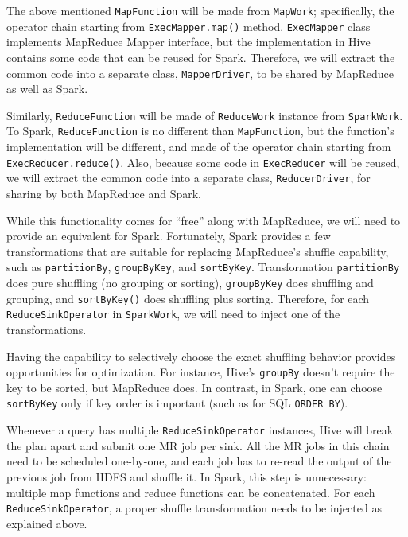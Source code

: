 \documentclass{vldb}
\begin{document}

The above mentioned \texttt{MapFunction} will be made from
\texttt{MapWork}; specifically, the operator chain starting from
\texttt{ExecMapper.map()} method. \texttt{ExecMapper} class implements
MapReduce Mapper interface, but the implementation in Hive contains some
code that can be reused for Spark. Therefore, we will extract the common
code into a separate class, \texttt{MapperDriver}, to be shared by
MapReduce as well as Spark.


Similarly, \texttt{ReduceFunction} will be made of \texttt{ReduceWork}
instance from \texttt{SparkWork}. To Spark, \texttt{ReduceFunction} is
no different than \texttt{MapFunction}, but the function's
implementation will be different, and made of the operator chain
starting from \texttt{ExecReducer.reduce()}. Also, because some code in
\texttt{ExecReducer} will be reused, we will extract the common code
into a separate class, \texttt{ReducerDriver}, for sharing by both
MapReduce and Spark.


While this functionality comes for ``free'' along with MapReduce, we
will need to provide an equivalent for Spark. Fortunately, Spark
provides a few transformations that are suitable for replacing
MapReduce's shuffle capability, such as \texttt{partitionBy},
\texttt{groupByKey}, and \texttt{sortByKey}. Transformation
\texttt{partitionBy} does pure shuffling (no grouping or sorting),
\texttt{groupByKey} does shuffling and grouping, and
\texttt{sortByKey()} does shuffling plus sorting. Therefore, for each
\texttt{ReduceSinkOperator} in \texttt{SparkWork}, we will need to
inject one of the transformations.

Having the capability to selectively choose the exact shuffling behavior
provides opportunities for optimization. For instance, Hive's
\texttt{groupBy} doesn't require the key to be sorted, but MapReduce
does. In contrast, in Spark, one can choose \texttt{sortByKey} only if
key order is important (such as for SQL \texttt{ORDER BY}).


Whenever a query has multiple \texttt{ReduceSinkOperator} instances,
Hive will break the plan apart and submit one MR job per sink. All the
MR jobs in this chain need to be scheduled one-by-one, and each job has
to re-read the output of the previous job from HDFS and shuffle it. In
Spark, this step is unnecessary: multiple map functions and reduce
functions can be concatenated. For each \texttt{ReduceSinkOperator}, a
proper shuffle transformation needs to be injected as explained above.
\end{document}
